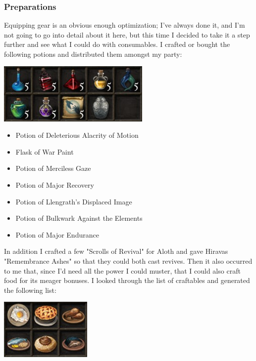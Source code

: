 \documentclass{article}
\begin{document}
\subsubsection{Preparations}

Equipping gear is an obvious enough optimization; I've always done it, and I'm not going to go into detail about it here, but this time I decided to take it a step further and see what I could do with consumables.  I crafted or bought the following potions and distributed them amongst my party:

\includegraphics{files/blog/2019_03_17_pillars_of_eternity_path_of_the_damned_act_iv/2019_03_17_potions.png}

\begin{itemize}
	\item Potion of Deleterious Alacrity of Motion
	\item Flask of War Paint
	\item Potion of Merciless Gaze
	\item Potion of Major Recovery
	\item Potion of Llengrath's Displaced Image
	\item Potion of Bulkwark Against the Elements
	\item Potion of Major Endurance
\end{itemize}
In addition I crafted a few "Scrolls of Revival" for Aloth and gave Hiravas "Remembrance Ashes" so that they could both cast revives.  Then it also occurred to me that, since I'd need all the power I could muster, that I could also craft food for its meager bonuses.  I looked through the list of craftables and generated the following list:

\includegraphics{files/blog/2019_03_17_pillars_of_eternity_path_of_the_damned_act_iv/2019_03_17_food.png}
\end{document}
